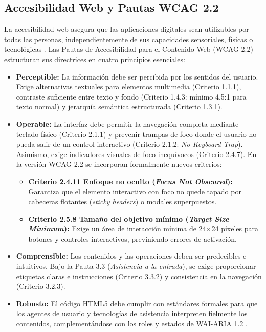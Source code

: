 \subsection{Accesibilidad Web y Pautas WCAG 2.2}
La accesibilidad web asegura que las aplicaciones digitales sean utilizables por todas las personas, independientemente de sus capacidades sensoriales, físicas o tecnológicas \cite{wcag22}. Las Pautas de Accesibilidad para el Contenido Web (WCAG 2.2) estructuran sus directrices en cuatro principios esenciales:
\begin{itemize}
  \item \textbf{Perceptible:} La información debe ser percibida por los sentidos del usuario. Exige alternativas textuales para elementos multimedia (Criterio 1.1.1), contraste suficiente entre texto y fondo (Criterio 1.4.3: mínimo 4.5:1 para texto normal) y jerarquía semántica estructurada (Criterio 1.3.1).
  \item \textbf{Operable:} La interfaz debe permitir la navegación completa mediante teclado físico (Criterio 2.1.1) y prevenir trampas de foco donde el usuario no pueda salir de un control interactivo (Criterio 2.1.2: \textit{No Keyboard Trap}). Asimismo, exige indicadores visuales de foco inequívocos (Criterio 2.4.7). En la versión WCAG 2.2 se incorporan formalmente nuevos criterios:
    \begin{itemize}
      \item \textbf{Criterio 2.4.11 Enfoque no oculto (\textit{Focus Not Obscured}):} Garantiza que el elemento interactivo con foco no quede tapado por cabeceras flotantes (\textit{sticky headers}) o modales superpuestos.
      \item \textbf{Criterio 2.5.8 Tamaño del objetivo mínimo (\textit{Target Size Minimum}):} Exige un área de interacción mínima de 24$\times$24 píxeles para botones y controles interactivos, previniendo errores de activación.
    \end{itemize}
  \item \textbf{Comprensible:} Los contenidos y las operaciones deben ser predecibles e intuitivos. Bajo la Pauta 3.3 (\textit{Asistencia a la entrada}), se exige proporcionar etiquetas claras e instrucciones (Criterio 3.3.2) y consistencia en la navegación (Criterio 3.2.3).
  \item \textbf{Robusto:} El código HTML5 debe cumplir con estándares formales para que los agentes de usuario y tecnologías de asistencia interpreten fielmente los contenidos, complementándose con los roles y estados de WAI-ARIA 1.2 \cite{wai_aria12}.
\end{itemize}

